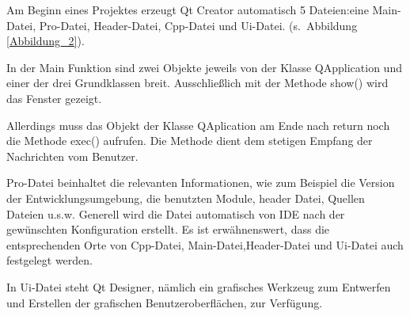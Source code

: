 \par Am Beginn eines Projektes erzeugt Qt Creator automatisch 5 Dateien:eine Main-Datei, Pro-Datei, Header-Datei, Cpp-Datei und Ui-Datei. (s. Abbildung \ref{Abbildung_2}). 
\par In der Main Funktion sind zwei Objekte jeweils von der Klasse QApplication und einer der drei Grundklassen breit. Ausschließlich mit der Methode show() wird das Fenster gezeigt. 
\par Allerdings muss das Objekt der Klasse QAplication am Ende nach return noch die Methode exec() aufrufen. Die Methode dient dem stetigen Empfang der Nachrichten vom Benutzer.  
\par Pro-Datei beinhaltet die relevanten Informationen, wie zum Beispiel die Version der Entwicklungsumgebung, die benutzten Module, header Datei, Quellen Dateien u.s.w. Generell wird die Datei automatisch von IDE nach der gewünschten Konfiguration erstellt. Es ist erwähnenswert, dass die entsprechenden Orte von Cpp-Datei, Main-Datei,Header-Datei und Ui-Datei auch festgelegt werden.   
\par In Ui-Datei steht Qt Designer, nämlich ein grafisches Werkzeug zum Entwerfen und Erstellen der grafischen Benutzeroberflächen, zur Verfügung.   

